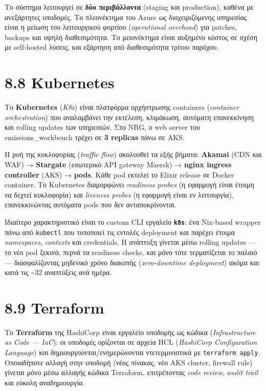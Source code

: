 Το σύστημα λειτουργεί σε \textbf{δύο περιβάλλοντα} (staging και
production), καθένα με ανεξάρτητες υποδομές. Το πλεονέκτημα του Azure ως
διαχειριζόμενης υπηρεσίας είναι η μείωση του λειτουργικού φορτίου
(\emph{operational overhead}) για patches, backups και υψηλή
διαθεσιμότητα. Το μειονέκτημα είναι αυξημένο κόστος σε σχέση με
self-hosted λύσεις, και εξάρτηση από διαθεσιμότητα τρίτου παρόχου.

\section{8.8 Kubernetes}\label{kubernetes}

Το \textbf{Kubernetes} (\emph{K8s}) είναι πλατφόρμα ορχήστρωσης
containers (\emph{container orchestration}) που αναλαμβάνει την
εκτέλεση, κλιμάκωση, αυτόματη επανεκκίνηση και rolling updates των
υπηρεσιών. Στο NRG, ο web server του emissions\_workbench τρέχει σε
\textbf{3 replicas} πάνω σε AKS.

Η ροή της κυκλοφορίας (\emph{traffic flow}) ακολουθεί τα εξής βήματα:
\textbf{Akamai} (CDN και WAF) → \textbf{Stargate} (εσωτερικό API gateway
Maersk) → \textbf{nginx ingress controller} (AKS) → \textbf{pods}. Κάθε
pod εκτελεί το Elixir release σε Docker container. Το Kubernetes
διαμορφώνει \emph{readiness probes} (η εφαρμογή είναι έτοιμη να δεχτεί
κυκλοφορία) και \emph{liveness probes} (η εφαρμογή είναι εν λειτουργία),
επανεκκινώντας αυτόματα pods που δεν ανταποκρίνονται.

Ιδιαίτερο χαρακτηριστικό είναι το custom CLI εργαλείο
\textbf{\texttt{k8s}}: ένα Nix-based wrapper πάνω από \texttt{kubectl}
που τυποποιεί τις εντολές deployment και παρέχει έτοιμα
\emph{namespaces}, \emph{contexts} και credentials. Η ανάπτυξη γίνεται
μέσω rolling updates --- το νέο pod ξεκινά, περνά τα readiness checks,
και μόνο τότε τερματίζεται το παλαιό --- διασφαλίζοντας μηδενικό χρόνο
διακοπής (\emph{zero-downtime deployment}) ακόμα και κατά τις
\textasciitilde32 αναπτύξεις ανά ημέρα.

\section{8.9 Terraform}\label{terraform}

Το \textbf{Terraform} της HashiCorp είναι εργαλείο υποδομής ως κώδικα
(\emph{Infrastructure as Code --- IaC}): οι υποδομές ορίζονται σε αρχεία
HCL (\emph{HashiCorp Configuration Language}) και
δημιουργούνται/ενημερώνονται ντετερμινιστικά με
\texttt{terraform\ apply}. Οποιαδήποτε αλλαγή στην υποδομή (νέος
πίνακας, νέο AKS cluster, firewall rule) γίνεται μόνο μέσω αλλαγής
κώδικα Terraform, επιτρέποντας \emph{code review}, \emph{audit trail}
και εύκολη αναδημιουργία.

